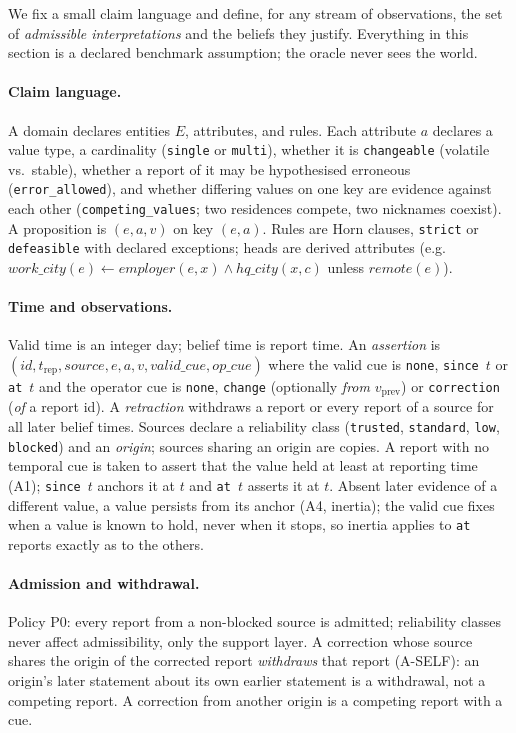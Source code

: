 We fix a small claim language and define, for any stream of observations, the set of \emph{admissible interpretations} and the beliefs they justify. Everything in this section is a declared benchmark assumption; the oracle never sees the world.

\paragraph{Claim language.} A domain declares entities $E$, attributes, and rules. Each attribute $a$ declares a value type, a cardinality (\texttt{single} or \texttt{multi}), whether it is \texttt{changeable} (volatile vs.\ stable), whether a report of it may be hypothesised erroneous (\texttt{error\_allowed}), and whether differing values on one key are evidence against each other (\texttt{competing\_values}; two residences compete, two nicknames coexist). A proposition is $(e,a,v)$ on key $(e,a)$. Rules are Horn clauses, \texttt{strict} or \texttt{defeasible} with declared exceptions; heads are derived attributes (e.g.\ $\mathit{work\_city}(e)\leftarrow \mathit{employer}(e,x)\wedge \mathit{hq\_city}(x,c)$ unless $\mathit{remote}(e)$).

\paragraph{Time and observations.} Valid time is an integer day; belief time is report time. An \emph{assertion} is $(\mathit{id}, t_{\mathrm{rep}}, \mathit{source}, e,a,v, \mathit{valid\_cue}, \mathit{op\_cue})$ where the valid cue is \texttt{none}, \texttt{since}~$t$ or \texttt{at}~$t$ and the operator cue is \texttt{none}, \texttt{change} (optionally \emph{from} $v_{\mathrm{prev}}$) or \texttt{correction} (\emph{of} a report id). A \emph{retraction} withdraws a report or every report of a source for all later belief times. Sources declare a reliability class (\texttt{trusted}, \texttt{standard}, \texttt{low}, \texttt{blocked}) and an \emph{origin}; sources sharing an origin are copies. A report with no temporal cue is taken to assert that the value held at least at reporting time (A1); \texttt{since}~$t$ anchors it at $t$ and \texttt{at}~$t$ asserts it at $t$. Absent later evidence of a different value, a value persists from its anchor (A4, inertia); the valid cue fixes when a value is known to hold, never when it stops, so inertia applies to \texttt{at} reports exactly as to the others.

\paragraph{Admission and withdrawal.} Policy P0: every report from a non-blocked source is admitted; reliability classes never affect admissibility, only the support layer. A correction whose source shares the origin of the corrected report \emph{withdraws} that report (A-SELF): an origin's later statement about its own earlier statement is a withdrawal, not a competing report. A correction from another origin is a competing report with a cue.

